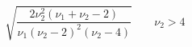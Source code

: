 

\[
\sqrt{\frac {2\nu_{2}^{2}(\nu_{1} + \nu_{2} - 2)} {\nu_{1}(\nu_{2} - 2)^{2}(\nu_{2} - 4)}} \;\;\;\;\;\;\; \nu_{2} > 4
\]



